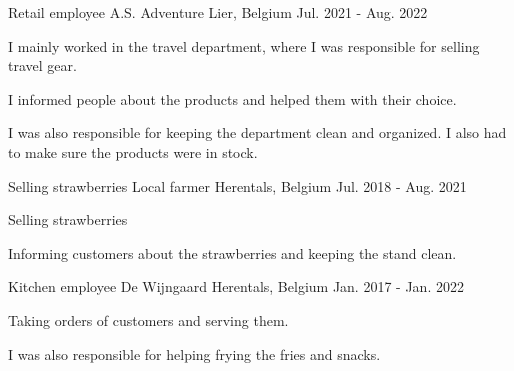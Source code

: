 

\begin{cventries}
    
  \cventry
    {Retail employee} %
    {A.S. Adventure} %
    {Lier, Belgium} %
    {Jul. 2021 - Aug. 2022} %
    {
      \begin{cvitems} %
        \item {I mainly worked in the travel department, where I was responsible for selling travel gear.}
        \item {I informed people about the products and helped them with their choice.}
        \item {I was also responsible for keeping the department clean and organized. I also had to make sure the products were in stock.} 
      \end{cvitems}
    }

  \cventry
    {Selling strawberries} %
    {Local farmer} %
    {Herentals, Belgium} %
    {Jul. 2018 - Aug. 2021} %
    {
      \begin{cvitems} %
        \item {Selling strawberries}
        \item {Informing customers about the strawberries and keeping the stand clean.}
      \end{cvitems}
    }

  \cventry
    {Kitchen employee} %
    {De Wijngaard} %
    {Herentals, Belgium} %
    {Jan. 2017 - Jan. 2022} %
    {
      \begin{cvitems} %
        \item {Taking orders of customers and serving them.}
        \item {I was also responsible for helping frying the fries and snacks.}
      \end{cvitems}
    }

\end{cventries}

